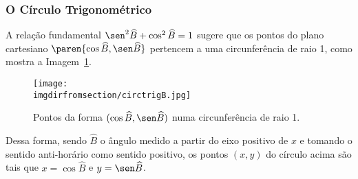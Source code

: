 \subsubsection{O Círculo Trigonométrico}

A relação fundamental $\sen^2 \widehat B + \cos^2 \widehat B = 1$
sugere que os pontos do plano cartesiano $\paren{\cos \widehat B,
\sen \widehat B}$ pertencem a uma circunferência de raio 1, como
mostra a Imagem~\ref{fig:circulo-trigonometrico-b}.
%
\begin{figure}[H]
\centering
\texttt{[image: \\imgdirfromsection/circtrigB.jpg]}
\caption{Pontos da forma $(\cos \widehat B, \sen \widehat B)$ numa circunferência de raio 1.}
\label{fig:circulo-trigonometrico-b}
\end{figure}

Dessa forma, sendo $\widehat B$ o ângulo medido a partir do eixo
positivo de $x$ e tomando o sentido anti-horário como sentido
positivo, os pontos $(x, y)$ do círculo acima são tais que $x = \cos
\widehat B$ e $y = \sen \widehat B$.